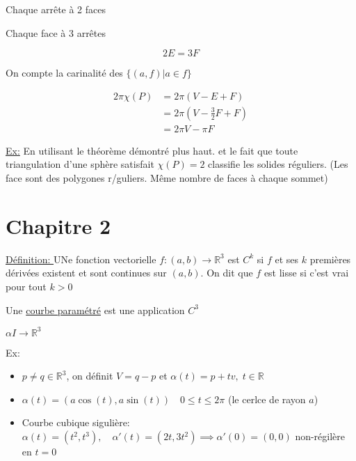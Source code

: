 \documentclass{article}
\begin{document}
Chaque arrête à 2 faces

Chaque face à 3 arrêtes

$$2E =3F$$

On compte la carinalité des $\{(a,f)| a\in f\}$

\begin{align*}
	2\pi\chi(P) & = 2\pi(V-E+F)         \\
	            & =2\pi(V-\frac32 F +F) \\
	            & = 2\pi V-\pi F
\end{align*}

\underline{Ex:} En utilisant le théorème démontré plus haut. et le fait que toute triangulation d'une sphère satisfait $\chi(P)=2$ classifie les solides réguliers. (Les face sont des polygones r/guliers. Même nombre de faces à chaque sommet)


\section{Chapitre 2}

\underline{Définition: } UNe fonction vectorielle $f:(a,b) \to \mathbb{R}^3$ est $C^k$ si $f$ et ses $k$ premières dérivées existent et sont continues sur $(a,b)$. On dit que $f$ est lisse si c'est vrai pour tout $k>0$

Une \underline{courbe paramétré} est une application  $C^3$

$\alpha I\to \mathbb{R}^3$

Ex:
\begin{itemize}
	\item $p \neq q \in \mathbb{R}^3$, on définit $V=q-p$ et $\alpha(t) = p+tv, \; t\in \mathbb{R}$
	\item $\alpha(t) = (a\cos(t), a\sin(t))\quad 0\leq t\leq 2\pi$ (le cerlce de rayon $a$)
	\item Courbe cubique sigulière: $\alpha(t) = (t^2, t^3), \quad \alpha'(t) = (2t, 3t^2) \implies \alpha'(0)=(0,0)$
	      non-régilère en $t=0$
\end{itemize}
\end{document}
